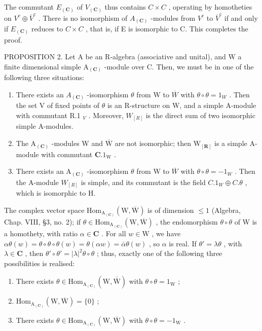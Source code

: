 The commutant \(E_{(\mathbf{C})}\) of \(V_{(\mathbf{C})}\) thus contains \(C \times C\) , operating by homotheties on \(V^{c} \oplus \overline{V}^{c}\) . There is no isomorphism of \(A_{(\mathbf{C})}\) -modules from \(V^{c}\) to \(\overline{V}^{c}\) if and only if \(E_{(\mathbf{C})}\) reduces to \(C \times C\) , that is, if E is isomorphic to C. This completes the proof.

PROPOSITION 2. Let A be an R-algebra (associative and unital), and W a finite dimensional simple \(\mathrm{A}_{(\mathbf{C})}\) -module over C. Then, we must be in one of the following three situations:

\begin{enumerate}
\def\labelenumi{\alph{enumi})}
\item
  There exists an \(A_{(\mathbf{C})}\) -isomorphism \(\theta\) from W to \(\overline{W}\) with \(\theta \circ \theta = 1_{W}\) . Then the set V of fixed points of \(\theta\) is an R-structure on W, and a simple A-module with commutant R.1 \(_{V}\) . Moreover, \(W_{[R]}\) is the direct sum of two isomorphic simple A-modules.
\item
  The \(\mathrm{A}_{(\mathbf{C})}\) -modules W and \(\overline{\mathrm{W}}\) are not isomorphic; then \(\mathrm{W}_{[\mathbf{R}]}\) is a simple A-module with commutant \(\mathbf{C}.1_{\mathrm{W}}\) .
\item
  There exists an \(\mathrm{A}_{(\mathbf{C})}\) -isomorphism \(\theta\) from W to \(\overline{W}\) with \(\theta \circ \theta = -1_{W}\) . Then the A-module \(W_{[R]}\) is simple, and its commutant is the field \(C.1_{W} \oplus C.\theta\) , which is isomorphic to H.
\end{enumerate}

The complex vector space \(\mathrm{Hom}_{\mathrm{A}_{(\mathbf{C})}}(\mathrm{W},\overline{\mathrm{W}})\) is of dimension \(\leq 1\) (Algebra, Chap. VIII, §3, no. 2); if \(\theta \in \mathrm{Hom}_{\mathrm{A}_{(\mathbf{C})}}(\mathrm{W},\overline{\mathrm{W}})\) , the endomorphism \(\theta \circ \theta\) of W is a homothety, with ratio \(\alpha \in \mathbf{C}\) . For all \(w \in \mathrm{W}\) , we have \(\alpha \theta(w) = \theta \circ \theta \circ \theta(w) = \theta(\alpha w) = \bar{\alpha} \theta(w)\) , so \(\alpha\) is real. If \(\theta' = \lambda \theta\) , with \(\lambda \in \mathbf{C}\) , then \(\theta' \circ \theta' = |\lambda|^2 \theta \circ \theta\) ; thus, exactly one of the following three possibilities is realised:

\begin{enumerate}
\def\labelenumi{\alph{enumi})}
\item
  There exists \(\theta \in \mathrm{Hom}_{\mathrm{A}_{(\mathbf{C})}}(\mathrm{W},\overline{\overline{\mathrm{W}}})\) with \(\theta \circ \theta = 1_{\mathrm{W}}\) ;
\item
  \(\mathrm{Hom}_{\mathrm{A}_{(\mathbf{C})}}(\mathrm{W},\overline{\mathrm{W}}) = \{0\}\) ;
\item
  There exists \(\theta \in \mathrm{Hom}_{\mathrm{A}_{(\mathbf{C})}}(\mathrm{W},\overline{\mathrm{W}})\) with \(\theta \circ \theta = -1_{\mathrm{W}}\) .
\end{enumerate}

